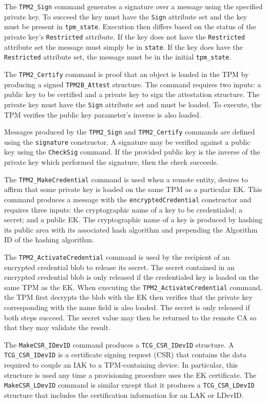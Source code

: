 \documentclass[runningheads]{llncs}
\begin{document}
The \verb|TPM2_Sign| command generates a signature over a message
using the specified private key.  To succeed the key must have the
\verb|Sign| attribute set and the key must be present in
\verb|tpm_state|. Execution then differs based on the status of the
private key's \verb|Restricted| attribute. If the key does not have
the \verb|Restricted| attribute set the message must simply be in
\verb|state|. If the key does have the \verb|Restricted| attribute
set, the message must be in the initial \verb|tpm_state|.

The \verb|TPM2_Certify| command is proof that an object is loaded in
the TPM by producing a signed \verb|TPM2B_Attest| structure. The
command requires two inputs: a public key to be certified and a
private key to sign the attestation structure. The private key must
have the \verb|Sign| attribute set and must be loaded. To execute, the
TPM verifies the public key parameter's inverse is also
loaded.

Messages produced by the \verb|TPM2_Sign| and \verb|TPM2_Certify|
commands are defined using the \verb|signature| constructor. A
signature may be verified against a public key using the
\verb|CheckSig| command. If the provided public key is the inverse of
the private key which performed the signature, then the check
succeeds.

The \verb|TPM2_MakeCredential| command is used when a remote entity,
desires to affirm that some private key is loaded on the same TPM as a
particular EK. This command produces a message with the
\verb|encryptedCredential| constructor and requires three inputs: the
cryptographic name of a key to be credentialed; a secret; and a public
EK. The cryptographic name of a key is produced by hashing its public
area with its associated hash algorithm and prepending the Algorithm
ID of the hashing algorithm.

The \verb|TPM2_ActivateCredential| command is used by the recipient of
an encrypted credential blob to release its secret.  The secret
contained in an encrypted credential blob is only released if the
credentialed key is loaded on the same TPM as the EK.  When executing
the \verb|TPM2_ActivateCredential| command, the TPM first decrypts the
blob with the EK then verifies that the private key corresponding with
the name field is also loaded. The secret is only released if both
steps succeed. The secret value may then be returned to the remote CA
so that they may validate the result.

The \verb|MakeCSR_IDevID| command produces a \verb|TCG_CSR_IDevID|
structure.  A \verb|TCG_CSR_IDevID| is a certificate signing request
(CSR) that contains the data required to couple an IAK to a
TPM-containing device.  In particular, this structure is used any time
a provisioning procedure uses the EK certificate.  The
\verb|MakeCSR_LDevID| command is similar except that it produces a
\verb|TCG_CSR_LDevID| structure that includes the certification
information for an LAK or LDevID.
\end{document}
